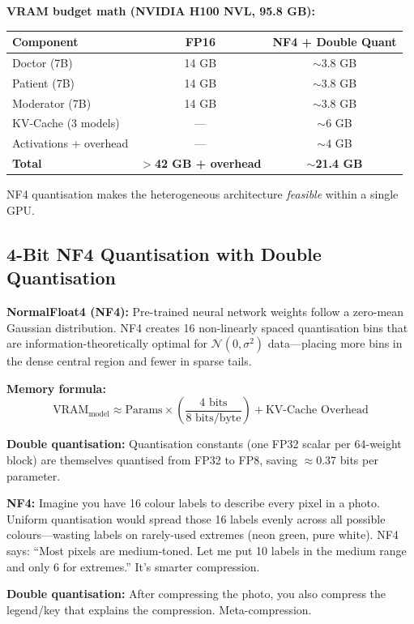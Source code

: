 \textbf{VRAM budget math (NVIDIA H100 NVL, 95.8 GB):}
\begin{center}
\begin{tabular}{@{}lcc@{}}
\toprule
\textbf{Component} & \textbf{FP16} & \textbf{NF4 + Double Quant} \\
\midrule
Doctor (7B) & 14 GB & $\sim$3.8 GB \\
Patient (7B) & 14 GB & $\sim$3.8 GB \\
Moderator (7B) & 14 GB & $\sim$3.8 GB \\
KV-Cache (3 models) & --- & $\sim$6 GB \\
Activations + overhead & --- & $\sim$4 GB \\
\midrule
\textbf{Total} & \textbf{$>$42 GB + overhead} & \textbf{$\sim$21.4 GB} \\
\bottomrule
\end{tabular}
\end{center}

NF4 quantisation makes the heterogeneous architecture \textit{feasible} within a single GPU.

\subsection{4-Bit NF4 Quantisation with Double Quantisation}

\begin{acadbox}[\textcolor{white}{Academic Definition}]
\textbf{NormalFloat4 (NF4):} Pre-trained neural network weights follow a zero-mean Gaussian distribution. NF4 creates 16 non-linearly spaced quantisation bins that are information-theoretically optimal for $\mathcal{N}(0, \sigma^2)$ data---placing more bins in the dense central region and fewer in sparse tails.

\textbf{Memory formula:}
\[
\text{VRAM}_{\text{model}} \approx \text{Params} \times \left(\frac{4 \text{ bits}}{8 \text{ bits/byte}}\right) + \text{KV-Cache Overhead}
\]

\textbf{Double quantisation:} Quantisation constants (one FP32 scalar per 64-weight block) are themselves quantised from FP32 to FP8, saving $\approx$0.37 bits per parameter.
\end{acadbox}

\begin{analogybox}[\textcolor{white}{Simple Analogy}]
\textbf{NF4:} Imagine you have 16 colour labels to describe every pixel in a photo. Uniform quantisation would spread those 16 labels evenly across all possible colours---wasting labels on rarely-used extremes (neon green, pure white). NF4 says: ``Most pixels are medium-toned. Let me put 10 labels in the medium range and only 6 for extremes.'' It's smarter compression.

\textbf{Double quantisation:} After compressing the photo, you also compress the legend/key that explains the compression. Meta-compression.
\end{analogybox}

